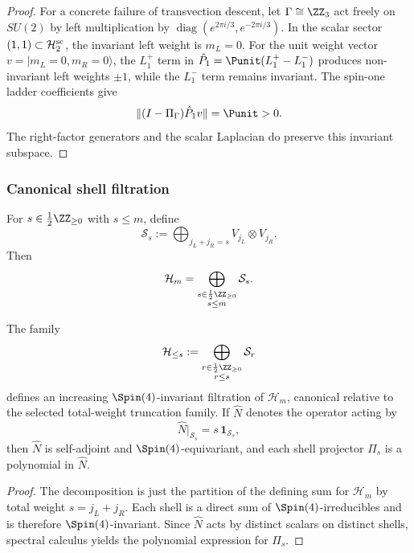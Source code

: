 \documentclass[11pt,a4paper]{article}
\begin{document}
\begin{proof}
For a concrete failure of transvection descent, let
\(\Gamma\cong\ZZ_3\) act freely on \(SU(2)\) by left multiplication
by \(\operatorname{diag}(e^{2\pi i/3},e^{-2\pi i/3})\).
In the scalar sector \((1,1)\subset\mathcal H_2^{\rm sc}\), the invariant
left weight is \(m_L=0\).  For the unit weight vector
\(v=|m_L=0,m_R=0\rangle\), the \(L_1^+\) term in
\(\hat P_1=\Punit(L_1^+-L_1^-)\) produces non-invariant left weights
\(\pm1\), while the \(L_1^-\) term remains invariant.  The spin-one
ladder coefficients give
\[
 \|(I-\Pi_\Gamma)\hat P_1v\|=\Punit>0.
\]
The right-factor generators and the scalar Laplacian do preserve this
invariant subspace.
\end{proof}

\subsubsection{Canonical shell filtration}
\label{p2:subsec:shell-filtration}

\begin{definition}
\label{p2:def:total-weight-shells}
For \(s\in \frac12\ZZ_{\ge 0}\) with \(s\le m\), define
\[
\mathcal S_s
:=
\bigoplus_{j_L+j_R=s} V_{j_L}\otimes V_{j_R}.
\]
Then
\[
\mathcal H_m
=
\bigoplus_{\substack{s\in \frac12\ZZ_{\ge 0}\\ s\le m}}
\mathcal S_s.
\]
\end{definition}

\begin{theorem}
\label{p2:thm:shell-filtration}
The family
\[
\mathcal H_{\le s}
:=
\bigoplus_{\substack{r\in \frac12\ZZ_{\ge 0}\\ r\le s}}
\mathcal S_r
\]
defines an increasing \(\Spin(4)\)-invariant filtration of \(\mathcal H_m\), canonical relative to the selected total-weight truncation family. If \(\hat N\) denotes the operator acting by
\[
\hat N|_{\mathcal S_s}=s\,\mathbf 1_{\mathcal S_s},
\]
then \(\hat N\) is self-adjoint and \(\Spin(4)\)-equivariant, and each shell projector \(\Pi_s\) is a polynomial in \(\hat N\).
\end{theorem}

\begin{proof}
The decomposition is just the partition of the defining sum for \(\mathcal H_m\) by total weight \(s=j_L+j_R\). Each shell is a direct sum of \(\Spin(4)\)-irreducibles and is therefore \(\Spin(4)\)-invariant. Since \(\hat N\) acts by distinct scalars on distinct shells, spectral calculus yields the polynomial expression for \(\Pi_s\).
\end{proof}
\end{document}

